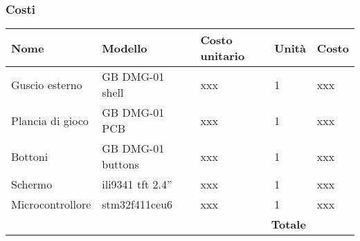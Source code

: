 \documentclass[12pt]{article}
\begin{document}
\subsubsection{Costi}
\begin{center}
\begin{table}[h]
\begin{tabular}{|llll|l|}
\hline
\multicolumn{1}{|l|}{\textbf{Nome}}    & \multicolumn{1}{l|}{\textbf{Modello}}             & \multicolumn{1}{l|}{\textbf{Costo unitario}} & \textbf{Unità} & \textbf{Costo} \\ \hline
\multicolumn{1}{|l|}{Guscio esterno}   & \multicolumn{1}{l|}{GB DMG-01 shell}      & \multicolumn{1}{l|}{xxx}                     & 1              & xxx            \\ \hline
\multicolumn{1}{|l|}{Plancia di gioco} & \multicolumn{1}{l|}{GB DMG-01 PCB}                & \multicolumn{1}{l|}{xxx}                     & 1              & xxx            \\ \hline
\multicolumn{1}{|l|}{Bottoni}          & \multicolumn{1}{l|}{GB DMG-01 buttons} & \multicolumn{1}{l|}{xxx}                     & 1              & xxx            \\ \hline
\multicolumn{1}{|l|}{Schermo}          & \multicolumn{1}{l|}{ili9341 tft 2.4''}            & \multicolumn{1}{l|}{xxx}                     & 1              & xxx            \\ \hline
\multicolumn{1}{|l|}{Microcontrollore} & \multicolumn{1}{l|}{stm32f411ceu6}                & \multicolumn{1}{l|}{xxx}                     & 1              & xxx            \\ \hline
\multicolumn{4}{|r|}{\textbf{Totale}}                                                                                                                               &                \\ \hline
\end{tabular}
\end{table}
\end{center}
\end{document}
